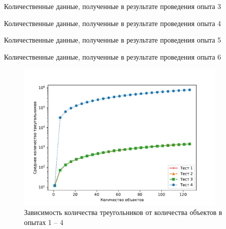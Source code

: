 \begin{table}[H]
    \caption{Количественные данные, полученные в результате проведения опыта 3}
    \label{tab:test3}
    \begin{adjustbox}{width=1\textwidth}
        
    \end{adjustbox}
\end{table}

%         

\begin{table}[H]
    \caption{Количественные данные, полученные в результате проведения опыта 4}
    \label{tab:test4}
    \begin{adjustbox}{width=1\textwidth}
        
    \end{adjustbox}
\end{table}

\begin{table}[H]
    \caption{Количественные данные, полученные в результате проведения опыта 5}
    \label{tab:test5}
    \begin{adjustbox}{width=1\textwidth}
        
    \end{adjustbox}
\end{table}

\begin{table}[H]
    \caption{Количественные данные, полученные в результате проведения опыта 6}
    \label{tab:test6}
    \begin{adjustbox}{width=1\textwidth}
        
    \end{adjustbox}
\end{table}

\newpage

\begin{figure}[H]
	\centering
    \includegraphics[width=0.9\textwidth]{img/1234/plot_triangles.pdf}
	\caption{Зависимость количества треугольников от количества объектов в опытах 1 -- 4}
	\label{fig:1234:tr}
\end{figure}

